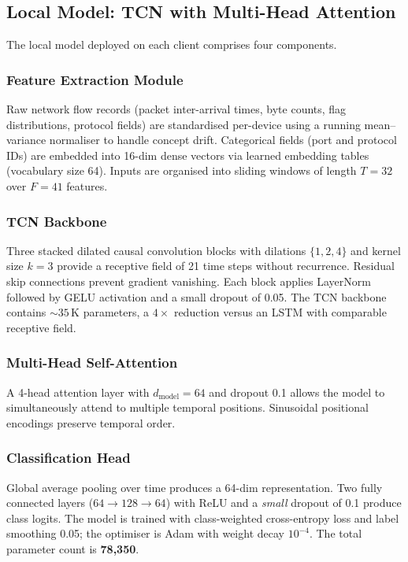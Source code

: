 \documentclass[conference]{IEEEtran}
\begin{document}
\subsection{Local Model: TCN with Multi-Head Attention}
The local model deployed on each client comprises four components.

\subsubsection{Feature Extraction Module}
Raw network flow records (packet inter-arrival times, byte counts,
flag distributions, protocol fields) are standardised per-device using
a running mean--variance normaliser to handle concept drift.
Categorical fields (port and protocol IDs) are embedded into 16-dim
dense vectors via learned embedding tables (vocabulary size 64).
Inputs are organised into sliding windows of length $T=32$ over $F=41$
features.

\subsubsection{TCN Backbone}
Three stacked dilated causal convolution blocks with dilations
$\{1,2,4\}$ and kernel size $k=3$ provide a receptive field of 21 time
steps without recurrence. Residual skip connections prevent gradient
vanishing. Each block applies LayerNorm followed by GELU activation
and a small dropout of 0.05. The TCN backbone contains $\sim 35$\,K
parameters, a $4\times$ reduction versus an LSTM with comparable
receptive field.

\subsubsection{Multi-Head Self-Attention}
A 4-head attention layer with $d_{\text{model}}=64$ and dropout 0.1
allows the model to simultaneously attend to multiple temporal
positions. Sinusoidal positional encodings preserve temporal order.

\subsubsection{Classification Head}
Global average pooling over time produces a 64-dim representation.
Two fully connected layers ($64\!\to\!128\!\to\!64$) with ReLU and a
\emph{small} dropout of 0.1 produce class logits. The model is trained
with class-weighted cross-entropy loss and label smoothing 0.05;
the optimiser is Adam with weight decay $10^{-4}$. The total parameter
count is \textbf{78,350}.
\end{document}
